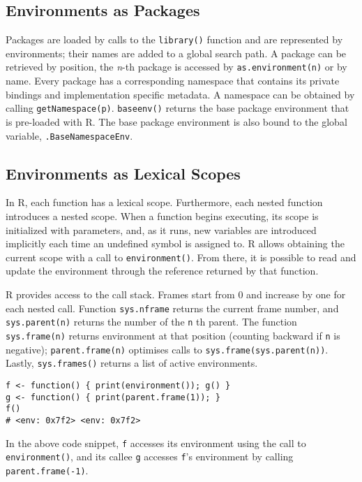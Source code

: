 \documentclass[sigplan,screen]{acmart}
\renewcommand{\c}[1]{\lstinline |#1|\xspace}
\begin{document}
\subsection{Environments as Packages}

Packages are loaded by calls to the \c{library()} function and are represented
by environments; their names are added to a global search path. A package can be
retrieved by position, the \emph{n}-th package is accessed by
\c{as.environment(n)} or by name. Every package has a corresponding namespace
that contains its private bindings and implementation specific metadata. A
namespace can be obtained by calling \c{getNamespace(p)}. \c{baseenv()} returns
the base package environment that is pre-loaded with R. The base package
environment is also bound to the global variable, \c{.BaseNamespaceEnv}.


\subsection{Environments as Lexical Scopes}

In R, each function has a lexical scope. Furthermore, each nested function
introduces a nested scope. When a function begins executing, its scope is
initialized with parameters, and, as it runs, new variables are introduced
implicitly each time an undefined symbol is assigned to. R allows obtaining the
current scope with a call to \c{environment()}. From there, it is possible to
read and update the environment through the reference returned by that function.

R provides access to the call stack. Frames start from 0 and increase by one
for each nested call. Function \c{sys.nframe} returns the current frame
number, and \c{sys.parent(n)} returns the number of the \c{n}th parent.
The function \c{sys.frame(n)} returns environment at that position (counting
backward if \c{n} is negative); \c{parent.frame(n)} optimises calls to
\c{sys.frame(sys.parent(n))}. Lastly, \c{sys.frames()} returns a list of
active environments.

\vspace{1mm}
\begin{lstlisting}
f <- function() { print(environment()); g() }
g <- function() { print(parent.frame(1)); }
f()
# <env: 0x7f2> <env: 0x7f2>
\end{lstlisting}

\noindent
In the above code snippet, \c{f} accesses its environment using the call to
\c{environment()}, and its callee \c{g} accesses \c{f}'s environment by calling
\c{parent.frame(-1)}.
\end{document}
